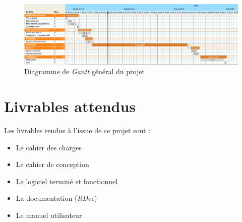 \documentclass{report}
\begin{document}
	\begin{figure}[H]
		\centering
		\caption{Diagramme de \textit{Gantt} général du projet}
		\includegraphics[width=17cm]{ganttGeneral.png}
	\end{figure}	     
		
		
\chapter{Livrables attendus}
	Les livrables rendus à l'issue de ce projet sont :
	\begin{itemize}
	\item Le cahier des charges
	\item Le cahier de conception
	\item Le logiciel terminé et fonctionnel
	\item La documentation (\textit{RDoc})
	\item Le manuel utilisateur
	\end{itemize}
		
		
		
\end{document}
